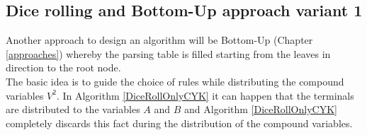 \subsection{Dice rolling and Bottom-Up approach variant 1}
Another approach to design an algorithm will be Bottom-Up (Chapter \ref{approaches}) whereby the parsing table is filled starting from the leaves in direction to the root node.\\
The basic idea is to guide the choice of rules while distributing the compound variables $V^2$. In Algorithm \ref{DiceRollOnlyCYK} it can happen that the terminals are distributed to the variables $A$ and $B$ and Algorithm \ref{DiceRollOnlyCYK} completely discards this fact during the distribution of the compound variables. \\
\noindent
\begin{figure}[h]
	\begin{minipage}{6in}
		\centering
		\hspace*{.2in}
\end{minipage}
\end{figure}
